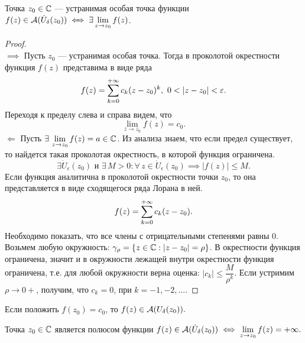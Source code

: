 	\newpage
	\begin{theorem}
		Точка $z_0\in\mathbb{C}$ --- устранимая особая точка функции $f(z)\in\A(\dot U_\delta(z_0))\iff \exists\Lim_{z\to z_0}f(z)$.
	\end{theorem}
	\begin{proof}
		\ \\$\boxed\implies$ Пусть $z_0$ --- устранимая особая точка. Тогда в проколотой окрестности функция $f(z)$ представима в виде ряда
		\[ f(z) = \Sum_{k=0}^{+\infty}c_k(z-z_0)^k,\ 0<|z-z_0|<\epsilon. \]
		Переходя к пределу слева и справа видем, что 
		\[ \lim_{z\to z_0}f(z) = c_0. \]
		$\boxed\Leftarrow$ Пусть $\exists\,\lim\limits_{z\to z_0}f(z) = a\in\mathbb{C}$. Из анализа знаем, что если предел существует, то найдется такая проколотая окрестность, в которой функция ограничена.
		\[ \exists\dot U_\epsilon(z_0) \text{ и } \exists\,M > 0 : \forall\,z\in\dot U_\epsilon(z_0)\implies|f(z)| \leqslant M. \]
		Если функция аналитична в проколотой окрестности точки $z_0$, то она представляется в виде сходящегося ряда Лорана в ней.
		\[ f(z) = \sum\limits_{k = 0}^{+\infty}c_k(z-z_0). \]
		Необходимо показать, что все члены с отрицательными степенями равны $0$. Возьмем любую окружность: $\gamma_\rho =\{ z\in\mathbb{C}: |z-z_0|=\rho \}$.
		В окрестности функция ограничена, значит и в окружности лежащей внутри окрестности функция ограничена, т.е. для любой окружности верна оценка: $|c_k| \leqslant \dfrac{M}{\rho^k}$. Если устримим $\rho\to 0+$, получим, что $c_k = 0$, при $k = -1, -2, \ldots$.
	\end{proof}
	\begin{remark}
		Если положить $f(z_0) = c_0$, то $f(z)\in\mathcal{A}(U_\delta (z_0)).$
	\end{remark}
	\begin{theorem}
		Точка $z_0\in\mathbb{C}$ является полюсом функции $f(z)\in\A(\dot U_\delta(z_0))\iff\Lim_{z\to z_0}f(z) = +\infty.$
	\end{theorem}
